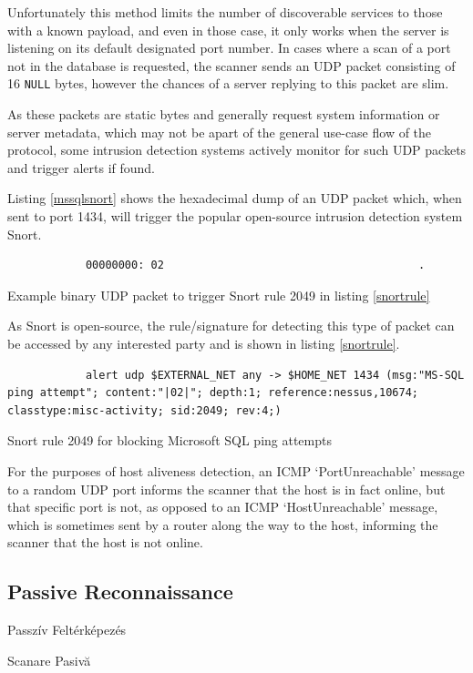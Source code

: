 \documentclass[a4paper,12pt]{article}
\newcommand\subsectionhu[1]{\addcontentsline{toc.hu}{subsection} {\protect\numberline{\thesubsection} #1}}
\newcommand\subsectionro[1]{\addcontentsline{toc.ro}{subsection} {\protect\numberline{\thesubsection} #1}}
\begin{document}
	Unfortunately this method limits the number of discoverable services to those with a known payload, and even in those case, it only works when the server is listening on its default designated port number. In cases where a scan of a port not in the database is requested, the scanner sends an UDP packet consisting of 16 \texttt{NULL} bytes, however the chances of a server replying to this packet are slim.
	
	As these packets are static bytes and generally request system information or server metadata, which may not be apart of the general use-case flow of the protocol, some intrusion detection systems actively monitor for such UDP packets and trigger alerts if found.
	
	Listing \ref{mssqlsnort} shows the hexadecimal dump of an UDP packet which, when sent to port 1434, will trigger the popular open-source intrusion detection system Snort\cite{snort49}.
	
	\begin{listing}[H]
		\begin{verbatim}
			00000000: 02                                       .
		\end{verbatim}
		\caption{Example binary UDP packet to trigger Snort rule 2049 in listing \ref{snortrule}}
		\label{mssqlsnort}
	\end{listing}
	
	As Snort is open-source, the rule/signature for detecting this type of packet can be accessed by any interested party and is shown in listing \ref{snortrule}.
	
	\begin{listing}[H]
		\begin{verbatim}
			alert udp $EXTERNAL_NET any -> $HOME_NET 1434 (msg:"MS-SQL ping attempt"; content:"|02|"; depth:1; reference:nessus,10674; classtype:misc-activity; sid:2049; rev:4;)
		\end{verbatim}
		\caption{Snort rule 2049 for blocking Microsoft SQL ping attempts\cite{snort49}}
		\label{snortrule}
	\end{listing}
	
	For the purposes of host aliveness detection, an ICMP `PortUnreachable' message to a random UDP port informs the scanner that the host is in fact online, but that specific port is not, as opposed to an ICMP `HostUnreachable' message, which is sometimes sent by a router along the way to the host, informing the scanner that the host is not online.

\subsection{Passive Reconnaissance}
\subsectionhu{Passzív Feltérképezés} \subsectionro{Scanare Pasivă}
\end{document}
